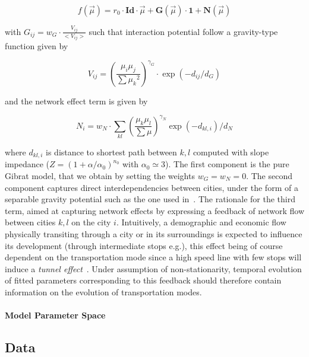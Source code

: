 \documentclass[Royal,sageh,times]{sagej}
\begin{document}
\begin{equation}
f(\vec{\mu}) = r_0\cdot \mathbf{Id}\cdot \vec{\mu} + \mathbf{G}\left(\vec{\mu}\right)\cdot \mathbf{1} + \mathbf{N}\left(\vec{\mu}\right)
\end{equation}

with $G_{ij} = w_G\cdot \frac{V_{ij}}{<V_{ij}>}$ such that interaction potential follow a gravity-type function given by 

\begin{equation}
V_{ij} = \left(\frac{\mu_i\mu_j}{\sum{\mu_k}^2}\right)^{\gamma_G}\cdot \exp{(-d_{ij}/d_G)}
\end{equation}

and the network effect term is given by


\begin{equation}
N_{i} = w_N \cdot \sum_{kl} \left(\frac{\mu_k\mu_l}{\sum\mu}\right)^{\gamma_N}\exp{(-d_{kl,i})/d_N}
\end{equation}

where $d_{kl,i}$ is distance to shortest path between $k,l$ computed with slope impedance ($Z=\left(1+\alpha/\alpha_0\right)^{n_0}$ with $\alpha_0\simeq 3$). The first component is the pure Gibrat model, that we obtain by setting the weights $w_G = w_N = 0$. The second component captures direct interdependencies between cities, under the form of a separable gravity potential such as the one used in~\cite{sanders1992systeme}. The rationale for the third term, aimed at capturing network effects by expressing a feedback of network flow between cities $k,l$ on the city $i$. Intuitively, a demographic and economic flow physically transiting through a city or in its surroundings is expected to influence its development (through intermediate stops e.g.), this effect being of course dependent on the transportation mode since a high speed line with few stops will induce a \emph{tunnel effect}~\cite{}.%
 Under assumption of non-stationarity, temporal evolution of fitted parameters corresponding to this feedback should therefore contain information on the evolution of transportation modes.


\paragraph{Model Parameter Space}





\subsection{Data}
\end{document}
